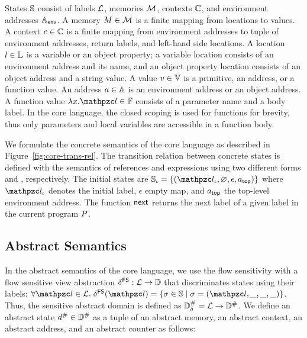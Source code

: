 States $\mathbb{S}$ consist of labels $\mathcal{L}$, memories $\mathcal{M}$, contexts
$\mathbb{C}$, and environment addresses $\mathbb{A}_{\textsf{env}}$.  A memory $M \in \mathcal{M}$
is a finite mapping from locations to values.  A context $c \in \mathbb{C}$ is
a finite mapping from environment addresses to tuple of environment addresses,
return labels, and left-hand side locations.  A location $l \in \mathbb{L}$ is a
variable or an object property; a variable location consists of an environment
address and its name, and an object property location consists of an object
address and a string value.  A value $v \in \mathbb{V}$ is a primitive, an
address, or a function value.  An address $a \in \mathbb{A}$ is an environment
address or an object address.  A function value $\fval{x}{\lab} \in \fvalset$
consists of a parameter name and a body label.  In the core language, the closed
scoping is used for functions for brevity, thus only parameters and local
variables are accessible in a function body.

We formulate the concrete semantics of the core language as described in
Figure~\ref{fig:core-trans-rel}.  The transition relation between concrete
states is defined with the semantics of references and expressions using two
different forms  and
\fbox{$\exprrule{\st}{\expr}{\val}$}, respectively.  The initial states are
$\istset = \{ (\ilab, \varnothing, \epsilon, \tladdr) \}$ where $\ilab$ denotes
the initial label, $\epsilon$ empty map, and $a_{\textsf{top}}$ the top-level
environment address.  The function $\textsf{next}$ returns the next label of a
given label in the current program $P$.

\subsection{Abstract Semantics}
In the abstract semantics of the core language, we use the flow sensitivity with a
flow sensitive view abstraction $\delta^{\textsf{FS}}: \mathcal{L} \rightarrow \mathbb{D}$ that
discriminates states using their labels: $\forall \lab \in \labset. \;
\fsviewmap(\lab) = \{ \st \in \stset \mid \st = (\lab, \_, \_, \_) \}$. Thus, the
sensitive abstract domain is defined as ${\mathbb{D}}^{\#}_\delta = \mathcal{L} \rightarrow
{\mathbb{D}}^{\#}$.  We define an abstract state ${d}^{\#} \in {\mathbb{D}}^{\#}$ as a tuple of an
abstract memory, an abstract context, an abstract address, and an
abstract counter as follows:

